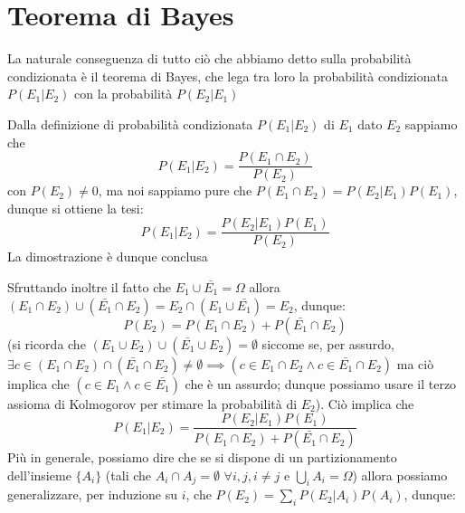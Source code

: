 \documentclass{report}
\begin{document}
\section{Teorema di Bayes}
La naturale conseguenza di tutto ciò che abbiamo detto sulla probabilità condizionata è il teorema di Bayes, che lega tra loro la probabilità condizionata $P(E_1 | E_2)$ con la probabilità $P(E_2 | E_1)$
\begin{myproof}
	Dalla definizione di probabilità condizionata $P(E_1 | E_2)$ di $E_1$ dato $E_2$ sappiamo che
	$$
		P(E_1 | E_2) = \frac{P(E_1 \cap E_2)}{P(E_2)}
	$$
	con $P(E_2) \neq 0$, ma noi sappiamo pure che $P(E_1 \cap E_2) = P(E_2 | E_1)P(E_1)$, dunque si ottiene la tesi:
	$$
		P(E_1 | E_2) = \frac{P(E_2 | E_1)P(E_1)}{P(E_2)}
	$$
	La dimostrazione è dunque conclusa
\end{myproof}
\noindent Sfruttando inoltre il fatto che $E_1 \cup \bar{E_1} = \Omega$ allora $(E_1 \cap E_2) \cup (\bar{E_1} \cap E_2) = E_2 \cap (E_1 \cup \bar{E_1}) = E_2$, dunque:
$$
	P(E_2) = P(E_1 \cap E_2) + P(\bar{E_1} \cap E_2)
$$
(si ricorda che $(E_1 \cup E_2) \cup (\bar{E_1} \cup E_2) = \emptyset$ siccome se, per assurdo, $\exists c \in (E_1 \cap E_2) \cap (\bar{E_1} \cap E_2) \neq \emptyset \implies (c \in E_1 \cap E_2  \wedge c \in \bar{E_1} \cap E_2 )$ ma ciò implica che $(c \in E_1 \wedge c \in \bar{E_1})$ che è un assurdo; dunque possiamo usare il terzo assioma di Kolmogorov per stimare la probabilità di $E_2$). Ciò implica che
\begin{equation}
	P(E_1 | E_2) = \frac{P(E_2 | E_1)P(E_1)}{P(E_1 \cap E_2) + P(\bar{E_1} \cap E_2)}
\end{equation}
Più in generale, possiamo dire che se si dispone di un partizionamento dell'insieme $ \{ A_i \} $ (tali che $A_i \cap A_j = \emptyset \, \, \forall i, j, i \neq j$ e $\bigcup\limits_{i} A_i = \Omega$) allora possiamo generalizzare, per induzione su $i$, che $P(E_2) = \sum\limits_{i} P(E_2 | A_i)P(A_i)$, dunque:
\end{document}

